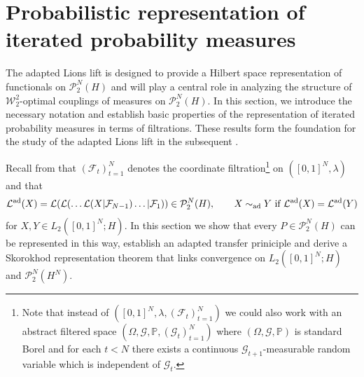 \documentclass[a4paper]{amsart}
\numberwithin{theorem}{section}
\theoremstyle{definition}
\newcommand{\F}{\mathcal{F}}
\newcommand{\G}{\mathcal{G}}
\newcommand{\law}{\mathcal{L}}
\newcommand{\W}{\mathcal{W}}
\newcommand{\Pc}{\mathcal P}
\renewcommand{\P}{\mathbb{P}}
\newcommand{\simad}{\sim_{\mathrm{ad}}}
\renewcommand{\H}{H}
\newcommand{\lawad}{\law^{\textup{ad}}}
\begin{document}
\section{Probabilistic representation of iterated probability measures}
\label{sec:AdLift}

The adapted Lions lift is designed to provide a Hilbert space representation of functionals on $\mathcal{P}_2^{N}(H)$ and will play a central role in analyzing the structure of $\W_2^2$-optimal couplings of measures on $\mathcal{P}_2^{N}(H)$. In this section, we introduce the necessary notation and establish basic properties of the representation of iterated probability measures in terms of filtrations. These results form the foundation for the study of the adapted Lions lift in the subsequent .


Recall from  that $(\F_t)_{t=1}^N$
denotes the coordinate  filtration\footnote{Note that instead of $([0,1]^N, \lambda, (\F_t)_{t=1}^N)$ we could also work with an abstract filtered space
$(\Omega,\G,\P,(\G_t)_{t=1}^N)$ where  $(\Omega,\G,\P)$ is standard Borel and for each $t<N$ there exists a continuous $\G_{t+1}$-measurable random variable which is independent of $\G_t$.} on  $([0,1]^N,  \lambda)$ and   that  
\begin{align}\label{eq:adlaw6}
 \lawad(X)=\law(\law( \ldots \law(X| \F_{N-1}) \ldots | \F_1)) \in \Pc_2^N(H),\quad  \quad   X\simad Y \text{ if }  \lawad(X) = \lawad(Y)\end{align} 
 for $X,Y \in L_2([0,1]^N; H).$
In this section we show that every $P\in \Pc_2^N(\H)$ can be represented in this way, establish an adapted transfer priniciple and derive a Skorokhod representation theorem that links convergence on $L_2([0,1]^N; H)$ and $\Pc_2^N(H^N)$.
 
\end{document}
